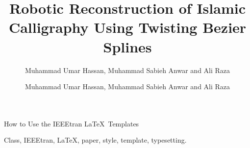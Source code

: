 \documentclass[lettersize,journal,onecolumn]{IEEEtran}
\begin{document}
\title{Robotic Reconstruction of Islamic Calligraphy Using Twisting Bezier Splines}
\author{Muhammad Umar Hassan, Muhammad Sabieh Anwar and Ali Raza
}

%
{How to Use the IEEEtran \LaTeX \ Templates}

\maketitle

\author{Muhammad Umar Hassan, Muhammad Sabieh Anwar and Ali Raza}
\begin{paracol}{2}
    \switchcolumn[0]
    
    \begin{IEEEkeywords}
    Class, IEEEtran, \LaTeX, paper, style, template, typesetting.
    \end{IEEEkeywords}
    
    
    
    
\end{paracol}
\end{document}
